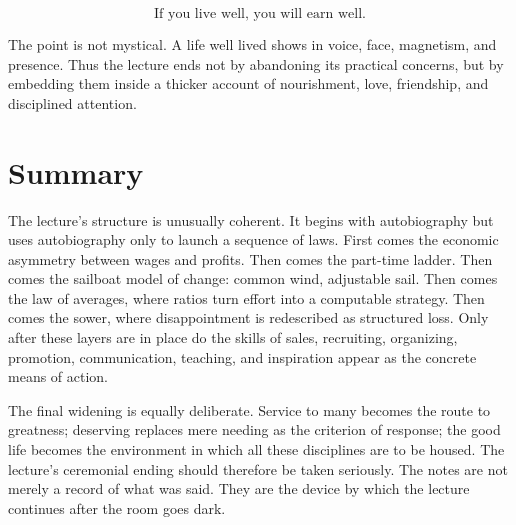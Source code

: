 \begin{equation}
\text{If you live well, you will earn well.}
\end{equation}

The point is not mystical. A life well lived shows in voice, face, magnetism, and presence. Thus the lecture ends not by abandoning its practical concerns, but by embedding them inside a thicker account of nourishment, love, friendship, and disciplined attention.

\section{Summary}

The lecture's structure is unusually coherent. It begins with autobiography but uses autobiography only to launch a sequence of laws. First comes the economic asymmetry between wages and profits. Then comes the part-time ladder. Then comes the sailboat model of change: common wind, adjustable sail. Then comes the law of averages, where ratios turn effort into a computable strategy. Then comes the sower, where disappointment is redescribed as structured loss. Only after these layers are in place do the skills of sales, recruiting, organizing, promotion, communication, teaching, and inspiration appear as the concrete means of action.

The final widening is equally deliberate. Service to many becomes the route to greatness; deserving replaces mere needing as the criterion of response; the good life becomes the environment in which all these disciplines are to be housed. The lecture's ceremonial ending should therefore be taken seriously. The notes are not merely a record of what was said. They are the device by which the lecture continues after the room goes dark.